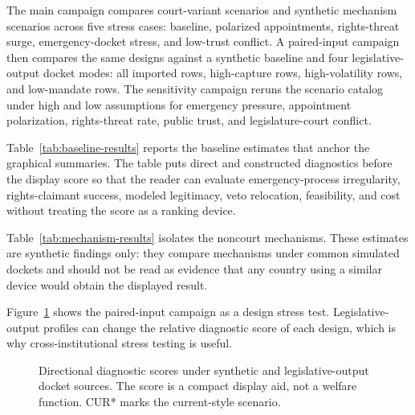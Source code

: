 \documentclass[
  journal=small,
  manuscript=research-article,
  year=2026
]{cup-journal}
\begin{document}
The main campaign compares court-variant scenarios and synthetic mechanism scenarios across five stress cases: baseline, polarized appointments, rights-threat surge, emergency-docket stress, and low-trust conflict. A paired-input campaign then compares the same designs against a synthetic baseline and four legislative-output docket modes: all imported rows, high-capture rows, high-volatility rows, and low-mandate rows. The sensitivity campaign reruns the scenario catalog under high and low assumptions for emergency pressure, appointment polarization, rights-threat rate, public trust, and legislature-court conflict.

Table~\ref{tab:baseline-results} reports the baseline estimates that anchor the graphical summaries. The table puts direct and constructed diagnostics before the display score so that the reader can evaluate emergency-process irregularity, rights-claimant success, modeled legitimacy, veto relocation, feasibility, and cost without treating the score as a ranking device.



Table~\ref{tab:mechanism-results} isolates the noncourt mechanisms. These estimates are synthetic findings only: they compare mechanisms under common simulated dockets and should not be read as evidence that any country using a similar device would obtain the displayed result.



Figure~\ref{fig:paired-import} shows the paired-input campaign as a design stress test. Legislative-output profiles can change the relative diagnostic score of each design, which is why cross-institutional stress testing is useful.

\begin{figure}[hbt!]
\centering

\caption{Directional diagnostic scores under synthetic and legislative-output docket sources. The score is a compact display aid, not a welfare function. CUR* marks the current-style scenario.}
\label{fig:paired-import}
\end{figure}
\end{document}
